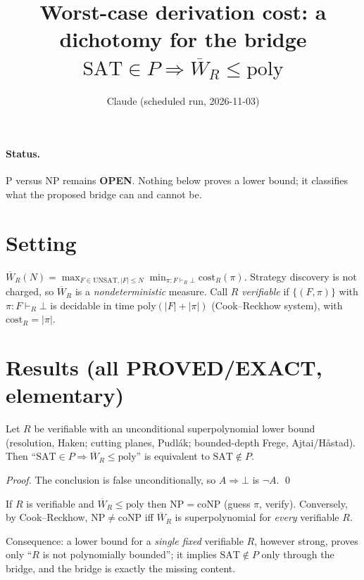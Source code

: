 \documentclass[11pt]{article}
\newcommand{\SAT}{\mathrm{SAT}}\newcommand{\UNSAT}{\mathrm{UNSAT}}
\begin{document}
\title{Worst-case derivation cost: a dichotomy for the bridge $\SAT\in P\Rightarrow \overline W_R\le\mathrm{poly}$}
\author{Claude (scheduled run, 2026-11-03)}\maketitle
\paragraph{Status.} P versus NP remains \textbf{OPEN}. Nothing below proves a lower bound; it classifies what the proposed bridge can and cannot be.

\section{Setting}
$\overline W_R(N)=\max_{F\in\UNSAT,|F|\le N}\min_{\pi:F\vdash_R\bot}\mathrm{cost}_R(\pi)$. Strategy discovery is not charged, so $\overline W_R$ is a \emph{nondeterministic} measure.
Call $R$ \emph{verifiable} if $\{(F,\pi)\}$ with $\pi:F\vdash_R\bot$ is decidable in time poly$(|F|+|\pi|)$ (Cook--Reckhow system), with $\mathrm{cost}_R=|\pi|$.

\section{Results (all PROVED/EXACT, elementary)}
\begin{prop}[Weak systems: bridge $=$ P$\ne$NP]\label{p1}
Let $R$ be verifiable with an unconditional superpolynomial lower bound (resolution, Haken; cutting planes, Pudl\'ak; bounded-depth Frege, Ajtai/H\aa stad). Then ``$\SAT\in P\Rightarrow \overline W_R\le\mathrm{poly}$'' is equivalent to $\SAT\notin P$.
\end{prop}
\emph{Proof.} The conclusion is false unconditionally, so $A\Rightarrow\bot$ is $\neg A$. \qed

\begin{prop}[Nondeterminism]\label{p2}
If $R$ is verifiable and $\overline W_R\le\mathrm{poly}$ then $\mathrm{NP}=\mathrm{coNP}$ (guess $\pi$, verify). Conversely, by Cook--Reckhow, NP$\ne$coNP iff $\overline W_R$ is superpolynomial for \emph{every} verifiable $R$.
\end{prop}
\noindent Consequence: a lower bound for a \emph{single fixed} verifiable $R$, however strong, proves only ``$R$ is not polynomially bounded''; it implies $\SAT\notin P$ only through the bridge, and the bridge is exactly the missing content.
\end{document}
